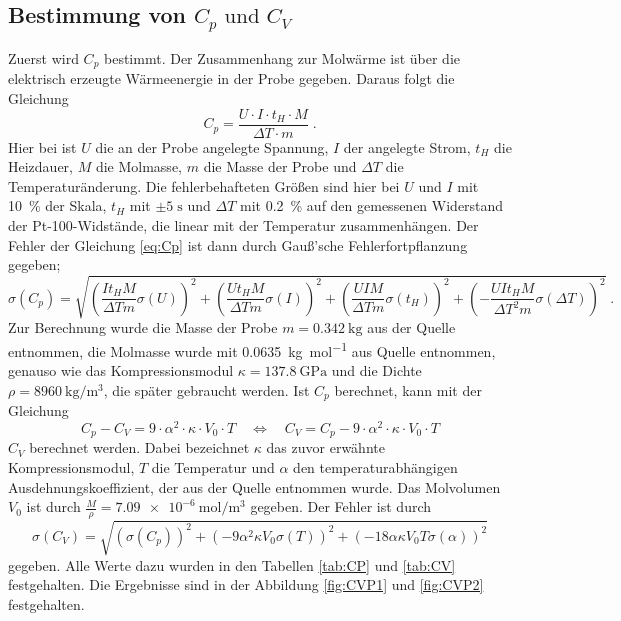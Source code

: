 \subsection{Bestimmung von \texorpdfstring{$C_p \text{ und } C_V$}{math}}
Zuerst wird $C_p$ bestimmt. Der Zusammenhang zur Molwärme ist über die elektrisch erzeugte 
Wärmeenergie in der Probe gegeben. Daraus folgt die Gleichung
\begin{equation}
C_p = \frac{U\cdot I \cdot t_H \cdot M}{\Delta T \cdot m} \; .
\label{eq:Cp}
\end{equation} 
Hier bei ist $U$ die an der Probe angelegte Spannung, $I$ der angelegte Strom, $t_H$ die Heizdauer, 
$M$ die Molmasse, $m$ die Masse der Probe und $\Delta T$ die Temperaturänderung. 
Die fehlerbehafteten Größen sind hier bei $U$ und $I$ mit \SI{10}{\percent} der Skala,
$t_H$ mit $\pm 5\;\si{\second}$ und $\Delta T$ mit \SI{0.2}{\percent} auf den gemessenen Widerstand 
der Pt-100-Widstände, die linear mit der Temperatur zusammenhängen. Der Fehler der 
Gleichung \eqref{eq:Cp} ist dann durch Gauß'sche Fehlerfortpflanzung gegeben;
\begin{equation}
\sigma(C_{p} )= \sqrt{\left(\frac{I t_H  M }{\Delta T  m} \sigma(U) \right)^2 + 
\left(\frac{U t_H  M}{\Delta T  m} \sigma(I) \right)^2 + 
\left(\frac{U  I  M}{\Delta T  m}\sigma(t_H) \right)^2 + 
\left(-\frac{U  I  t_H  M }{ \Delta T^2  m } \sigma(\Delta T) \right)^2 } \; .
\end{equation}
Zur Berechnung wurde die Masse der Probe $m = \SI{0.342}{\kilo\gram}$ aus der Quelle 
\cite{Anleitung} entnommen, die Molmasse wurde mit \SI{0.0635}{\kilo\gram\per\mol} aus Quelle 
\cite{Kupfer} entnommen, genauso wie das Kompressionsmodul $\kappa = \SI{137,8}{\giga\pascal}$ und 
die Dichte $\rho = \SI{8960}{\kilo\gram\per\cubic\meter}$, die später gebraucht werden. Ist $C_p$ 
berechnet, kann mit der Gleichung
\begin{equation}
C_p - C_V = 9\cdot \alpha^2 \cdot  \kappa \cdot V_0 \cdot T 
\quad \iff \quad 
C_V = C_p - 9\cdot \alpha^2 \cdot \kappa \cdot V_0 \cdot T  
\label{eq:Cv}
\end{equation}
$C_V$ berechnet werden.  Dabei bezeichnet $\kappa$ das zuvor erwähnte Kompressionsmodul, $T$ die 
Temperatur und $\alpha$ den temperaturabhängigen Ausdehnungskoeffizient, 
der aus der Quelle \cite{Anleitung} entnommen 
wurde. Das Molvolumen $V_0$ ist durch $\frac{M}{\rho} = \SI{7.09e-6}{\mol\per\cubic\meter}$ 
gegeben. Der Fehler ist durch 
\begin{equation}
\sigma(C_V) = \sqrt{\left(\sigma(C_p) \right)^2 + \left( -9\alpha^2 \kappa V_0 \sigma(T)\right)^2
+ \left(-18 \alpha \kappa V_0 T \sigma(\alpha) \right)^2}
\end{equation} 
gegeben. Alle Werte dazu wurden in den Tabellen \ref{tab:CP} und \ref{tab:CV} festgehalten. 
Die Ergebnisse sind in der Abbildung \ref{fig:CVP1} und \ref{fig:CVP2} festgehalten. 

